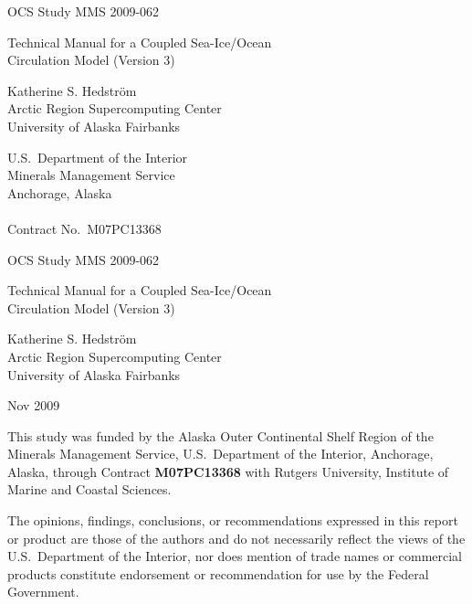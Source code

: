%
%


\pagestyle{empty}
\centerline{\hfill OCS Study MMS 2009-062}
\vspace {2 cm}
\begin{center}
  {\LARGE Technical Manual for a Coupled Sea-Ice/Ocean \\ Circulation
   Model (Version 3)  }
\end{center}
\vspace {2 cm}
\begin{center}
  Katherine S. Hedstr\"{o}m \\ Arctic Region Supercomputing Center
  \\ University of Alaska Fairbanks
\end{center}
\vspace {2 cm}
\begin{center}
  U.S.\ Department of the Interior \\ Minerals Management Service \\
  Anchorage, Alaska \\ \mbox{} \\ Contract No.\ M07PC13368
\end{center}
\newpage
\centerline{\hfill OCS Study MMS 2009-062}
\vspace {2 cm}
\begin{center}
  {\LARGE Technical Manual for a Coupled Sea-Ice/Ocean \\ Circulation
   Model (Version 3)  }
\end{center}
\vspace {2 cm}
\begin{center}
  Katherine S. Hedstr\"{o}m \\ Arctic Region Supercomputing Center
  \\ University of Alaska Fairbanks
\end{center}
\vspace {2 cm}
\centerline{Nov 2009}
\vfill


This study was funded by the Alaska Outer Continental Shelf Region
of the Minerals Management Service, U.S.\ Department of the
Interior, Anchorage, Alaska, through Contract
{\bf M07PC13368} with Rutgers University, Institute of Marine
and Coastal Sciences.

\vspace {1 cm}
The opinions, findings, conclusions, or recommendations expressed in
this report or product are those of the authors and do not
necessarily reflect the views of the U.S.\ Department of the
Interior, nor does mention of trade names or commercial products
constitute endorsement or recommendation for use by the Federal
Government.

\pagestyle{fancyplain}
\setcounter{page}{1}
\tableofcontents
\newpage
\listoffigures
\listoftables





%

%



%
\appendix






%




\newpage
\pagestyle{empty}

